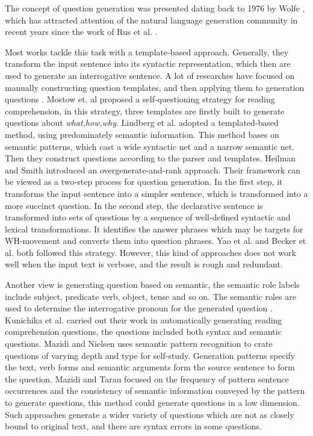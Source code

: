 \documentclass[runningheads,UTF8,article]{comsis2}
\newcommand\revised[1]{{\color{black} #1}}
\begin{document}
	
	The concept of question generation was presented dating back to 1976 by Wolfe \cite{wolfe},	which has attracted attention of the natural language generation community in recent years since the work of Rus et al. \cite{rus2010first}.
	
	
	Most works tackle this task with a template-based approach. Generally, they transform the input sentence into its syntactic representation, which then are used to generate an interrogative sentence. A lot of researches have focused on manually constructing question templates, and then applying them to generation questions \cite{mostow2009generating,lindberg2013generating,heilman2010good}. 
	Mostow et. al \cite{mostow2009generating} proposed a self-questioning strategy for \revised{reading comprehension}, in this strategy, three templates are firstly built to generate questions about \emph{what,how,why}. Lindberg et al.\cite{lindberg2013generating} adopted a templated-based method, using predominately semantic information.
	This method bases on semantic patterns, which cast a wide syntactic net and a narrow semantic net. Then they construct questions according to the parser and templates. Heilman and Smith \cite{heilman2010good} introduced an overgenerate-and-rank approach. \revised{Their framework can be viewed as a two-step process for question generation.  In the first step, it transforms the input sentence into a simpler sentence, which is transformed into a more succinct question. In the second step, the declarative sentence is transformed into sets of questions by a sequence of well-defined syntactic and lexical transformations. It identifies the answer phrases which may be targets for WH-movement and converts them into question phrases}. Yao et al. \cite{yao} and Becker et al.\cite{becker} both followed this strategy. However, this kind of approaches does not work well when the input text is verbose, and the result is rough and redundant.
	
	
	
	Another view is generating question based on semantic, the semantic role labels include subject, predicate verb, object, tense and so on. The semantic roles are used to determine the interrogative pronoun for the generated question \cite{Kunichika2001AutomatedQG,infusing,mazidi2014linguistic}. Kunichika et al. \cite{Kunichika2001AutomatedQG} carried out their work in automatically generating reading comprehension questions, the questions included both syntax and semantic questions.
	Mazidi and Nielsen \cite{mazidi2014linguistic} uses semantic pattern recognition to crate questions of varying depth and type for self-study. Generation patterns specify the text, verb forms and semantic arguments form the source sentence to form the question. Mazidi and Tarau \cite{infusing} focused on the frequency of pattern sentence occurrences and the consistency of semantic information conveyed by the pattern to generate questions, this method could generate questions in a low dimension. Such approaches generate a wider variety of questions which are not as closely bound to original text, and there are syntax errors in some questions.
	
\end{document}

